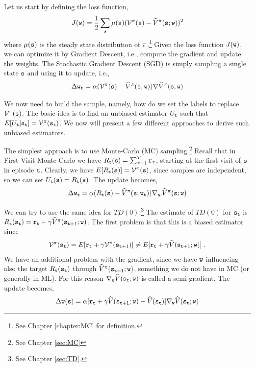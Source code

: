 Let us start by defining the loss function,
\[
J({\tt w})=\frac{1}{2}\sum_s
\mu({\tt s})(\mathcal{V}^\pi({\tt s})-\widehat{V}^\pi({\tt s};{\tt w}))^2
\]
where $\mu({\tt s})$ is the steady state distribution of
$\pi$.\footnote{See Chapter \ref{chapter:MC} for definition.} Given the loss function $J({\tt w})$, we can optimize it by Gradient Descent, i.e., compute the gradient and update the weights. The Stochastic
Gradient Descent (SGD) is simply sampling a single state ${\tt s}$
and using it to update, i.e.,
\[
\Delta {\tt w}_{\tt t} = \alpha (\mathcal{V}^\pi
({\tt s})-\widehat{V}^\pi({\tt s};{\tt w}))\nabla
\widehat{V}^\pi ({\tt s};{\tt w})
\]

We now need to build the sample, namely, how do we set the labels to
replace $\mathcal{V}^\pi ({\tt s})$. The basic idea is to find an
unbiased estimator $U_{\tt t}$ such that $E[U_{\tt t}
|{\tt s}_{\tt t}]=\mathcal{V}^\pi({\tt s}_{\tt t})$. We now will present
a few different approaches to derive such unbiased estimators.

The simplest approach is to use Monte-Carlo (MC)
sampling.\footnote{See Chapter \ref{sec:MC}} Recall that in First
Visit Monte-Carlo we have $R_{\tt t}({\tt s})=\sum_{\tau=1}^T
{\tt r}_\tau$, starting at the first visit of ${\tt s}$ in episode
${\tt t}$. Clearly, we have
$E[R_{\tt t}({\tt s})]=\mathcal{V}^\pi({\tt s})$, since samples are
independent, so we can set $U_{\tt t}({\tt s})=R_{\tt t}({\tt s})$. The
update becomes,
\[
\Delta {\tt w}_{\tt t} = \alpha
(R_{\tt t}({\tt s})-\widehat{V}^\pi({\tt s};{\tt w}_{\tt t}))\nabla_{w}
\widehat{V}^\pi ({\tt s};{\tt w})
\]

We can try to use the same idea for $TD(0)$.\footnote{See Chapter
\ref{sec:TD}.} The estimate of $TD(0)$ for ${\tt s}_{\tt t}$ is
$R_{\tt t}({\tt s}_{\tt t})={\tt r}_{\tt t}+\gamma
\widehat{V}^\pi({\tt s}_{{\tt t}+1};{\tt w})$. The first problem
is that this is a biased estimator since
\[
\mathcal{V}^\pi({\tt s}_{\tt t})=E[{\tt r}_{\tt t}+\gamma
\mathcal{V}^\pi({\tt s}_{{\tt t}+1})]\neq E[{\tt r}_{\tt t}+\gamma
\widehat{V}({\tt s}_{{\tt t}+1};{\tt w})]\;.
\]
We have an additional problem with the gradient, since we have
${\tt w}$ influencing also the target $R_{\tt t}({\tt s}_{\tt t})$
through $\widehat{V}^\pi({\tt s}_{{\tt t}+1};{\tt w})$, something
we do not have in MC (or generally in ML). For this reason
$\nabla_{\tt w} \widehat{V}({\tt s}_{\tt t};{\tt w})$ is called a
semi-gradient. The update becomes,
\[
\Delta {\tt w} ({\tt s})= \alpha[{\tt r}_{\tt t} +\gamma
\widehat{V}({\tt s}_{{\tt t}+1};{\tt w})-\widehat{V}({\tt s}_{\tt t})]\nabla_{\tt w}
\widehat{V}({\tt s}_{\tt t};{\tt w})
\]


